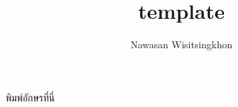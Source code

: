 \documentclass[10pt,a4paper]{article}
\title{template}
\author{Nawasan Wisitsingkhon}
\begin{document}
\LARGE พิมพ์อักษรที่นี่
\end{document}
